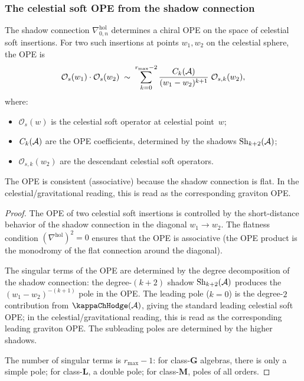 \subsubsection{The celestial soft OPE from the shadow connection}

\begin{theorem}
The shadow connection $\nabla^{\mathrm{hol}}_{0,n}$ determines a
chiral OPE on the space of celestial soft insertions. For two such
insertions at points $w_1, w_2$ on the celestial sphere, the OPE is
\begin{equation}%
\mathcal{O}_s(w_1) \cdot \mathcal{O}_s(w_2)
\;\sim\;
\sum_{k=0}^{r_{\max}-2}
\frac{C_k(\cA)}{(w_1 - w_2)^{k+1}}\;\mathcal{O}_{s,k}(w_2),
\end{equation}
where:
\begin{itemize}
\item $\mathcal{O}_s(w)$ is the celestial soft operator at
 celestial point~$w$;
\item $C_k(\mathcal{A})$ are the OPE coefficients, determined by the
 shadows $\operatorname{Sh}_{k+2}(\mathcal{A})$;
\item $\mathcal{O}_{s,k}(w_2)$ are the descendant celestial soft operators.
\end{itemize}
The OPE is consistent (associative) because the shadow connection
is flat. In the celestial/gravitational reading, this is read as the
corresponding graviton OPE.
\end{theorem}

\begin{proof}
The OPE of two celestial soft insertions is controlled by the short-distance
behavior of the shadow connection in the diagonal
$w_1 \to w_2$. The flatness condition
$(\nabla^{\mathrm{hol}})^2 = 0$ ensures that the OPE is
associative (the OPE product is the monodromy of the flat
connection around the diagonal).

The singular terms of the OPE are determined by the degree
decomposition of the shadow connection:
the degree-$(k+2)$ shadow $\operatorname{Sh}_{k+2}(\mathcal{A})$ produces the
$(w_1 - w_2)^{-(k+1)}$ pole in the OPE. The leading pole
($k=0$) is the degree-$2$ contribution from $\kappaChHodge(\cA)$,
giving the standard leading celestial soft OPE; in the
celestial/gravitational reading, this is read as the corresponding
leading graviton OPE.
The subleading poles are determined by the higher shadows.

The number of singular terms is $r_{\max} - 1$: for
class-$\mathbf{G}$ algebras, there is only a simple pole; for
class-$\mathbf{L}$, a double pole; for class-$\mathbf{M}$,
poles of all orders.
\end{proof}

